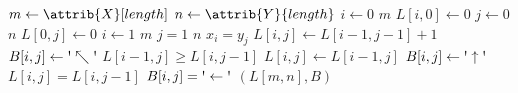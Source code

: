 \begin{codebox}
\li $m \gets \attrib{X}[length]$
\li $n \gets \attrib{Y}{length}$
\li \For $i \gets 0$ \To $m$
\li \Do
		$L[i,0] \gets 0$
	\End
\li \For $j \gets 0$ \To $n$
\li \Do
		$L[0,j] \gets 0$
	\End
\li \For $i \gets 1$ \To $m$
\li \Do
		\For $j = 1$ \To $n$
\li 	\Do
			\If $x_i = y_j$
\li 		\Then
				$L[i,j] \gets L[i-1,j-1] + 1$
\li				$B[i,j] \gets \textnormal{\textquotesingle}\nwarrow\textnormal{\textquotesingle}$
\li			\ElseIf $L[i-1,j] \geq L[i,j-1]$
\li			\Then
				$L[i,j] \gets L[i-1,j]$
\li				$B[i,j] \gets \textnormal{\textquotesingle}\uparrow\textnormal{\textquotesingle}$
\li			\ElseNoIf
\li				$L[i,j] = L[i,j-1]$
\li				$B[i,j] = \textnormal{\textquotesingle}\leftarrow\textnormal{\textquotesingle}$
			\End
		\End
	\End
\li \Return $(L[m,n],B)$
\end{codebox}